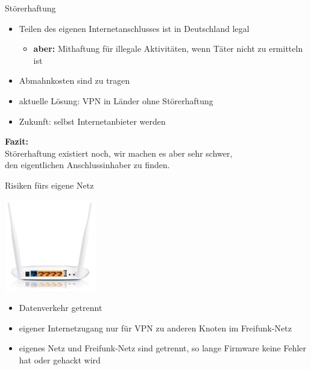 \documentclass{beamer}
\begin{document}
\begin{frame}{Störerhaftung}
\begin{itemize}
\pause\item Teilen des eigenen Internetanschlusses ist in Deutschland legal
\begin{itemize}
	\pause\item \textbf{aber:} Mithaftung für illegale Aktivitäten, wenn Täter nicht zu ermitteln ist
\end{itemize}
\pause\item Abmahnkosten sind zu tragen
\vfill
\pause\item aktuelle Lösung: VPN in Länder ohne Störerhaftung
\pause\item Zukunft: selbst Internetanbieter werden
\end{itemize}
\vfill
\centering
\pause \textbf{Fazit:}\\Störerhaftung existiert noch, wir machen es aber sehr schwer,\\den eigentlichen Anschlussinhaber zu finden.

\end{frame}

\begin{frame}{Risiken fürs eigene Netz}
\vfill
\begin{center}
\includegraphics[height=4cm]{images/WR842ND-back}
\end{center}
\begin{itemize}
\pause\item Datenverkehr getrennt
\pause\item eigener Internetzugang nur für VPN zu anderen Knoten im Freifunk-Netz
\pause\item eigenes Netz und Freifunk-Netz sind getrennt, so lange Firmware keine Fehler hat oder gehackt wird
\end{itemize}
\vfill
\end{frame}
\end{document}
